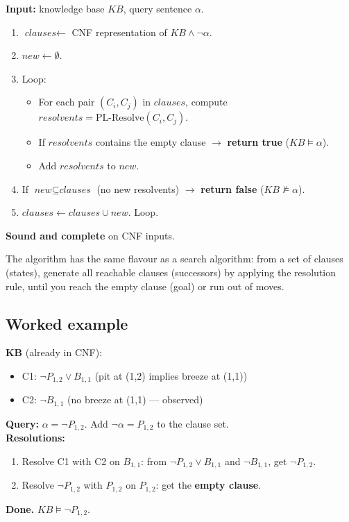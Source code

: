 \documentclass[11pt, a4paper]{article}
\begin{document}
\begin{exbox}
\textbf{Input:} knowledge base $KB$, query sentence $\alpha$.\\[0.3em]
\begin{enumerate}[itemsep=0pt, topsep=0pt]
  \item $\textit{clauses} \leftarrow $ CNF representation of $KB \land \neg\alpha$.
  \item $\textit{new} \leftarrow \emptyset$.
  \item Loop:
    \begin{itemize}[itemsep=0pt, topsep=0pt]
      \item For each pair $(C_i, C_j)$ in $\textit{clauses}$, compute $\textit{resolvents} = \mathrm{PL\text{-}Resolve}(C_i, C_j)$.
      \item If $\textit{resolvents}$ contains the empty clause $\to$ \textbf{return true} ($KB \models \alpha$).
      \item Add $\textit{resolvents}$ to $\textit{new}$.
    \end{itemize}
  \item If $\textit{new} \subseteq \textit{clauses}$ (no new resolvents) $\to$ \textbf{return false} ($KB \not\models \alpha$).
  \item $\textit{clauses} \leftarrow \textit{clauses} \cup \textit{new}$. Loop.
\end{enumerate}
\textbf{Sound and complete} on CNF inputs.
\end{exbox}

The algorithm has the same flavour as a search algorithm: from a set of clauses (states), generate all reachable clauses (successors) by applying the resolution rule, until you reach the empty clause (goal) or run out of moves.

\subsection{Worked example}

\begin{exbox}
\textbf{KB} (already in CNF):
\begin{itemize}[itemsep=0pt, topsep=0pt]
  \item C1: $\neg P_{1,2} \lor B_{1,1}$ \quad (pit at (1,2) implies breeze at (1,1))
  \item C2: $\neg B_{1,1}$ \quad (no breeze at (1,1) — observed)
\end{itemize}
\textbf{Query:} $\alpha = \neg P_{1,2}$. Add $\neg \alpha = P_{1,2}$ to the clause set.\\[0.3em]
\textbf{Resolutions:}
\begin{enumerate}[itemsep=0pt, topsep=0pt]
  \item Resolve C1 with C2 on $B_{1,1}$: from $\neg P_{1,2} \lor B_{1,1}$ and $\neg B_{1,1}$, get $\neg P_{1,2}$.
  \item Resolve $\neg P_{1,2}$ with $P_{1,2}$ on $P_{1,2}$: get the \textbf{empty clause}.
\end{enumerate}
\textbf{Done.} $KB \models \neg P_{1,2}$.
\end{exbox}
\end{document}
